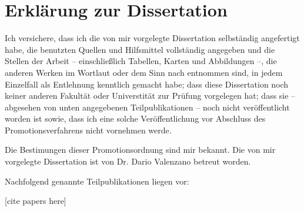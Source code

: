 
\cleardoublepage
\setsinglecolumn
\chapter*{\centering \LARGE Erkl\"arung zur Dissertation}
\pagestyle{empty}
Ich versichere, dass ich die von mir vorgelegte Dissertation selbst\"andig angefertigt habe, die benutzten Quellen und Hilfsmittel vollst\"andig angegeben und die Stellen der Arbeit -- einschlie{\ss}lich Tabellen, Karten und Abbildungen --, die anderen Werken im Wortlaut oder dem Sinn nach entnommen sind, in jedem Einzelfall als Entlehnung kenntlich gemacht habe; dass diese Dissertation noch keiner anderen Fakult\"at oder Universtit\"at zur Pr\"ufung vorgelegen hat; dass sie -- abgesehen von unten angegebenen Teilpublikationen -- noch nicht ver\"offentlicht worden ist sowie, dass ich eine solche Ver\"offentlichung vor Abschluss des Promotionsverfahrens nicht vornehmen werde.

\noindent Die Bestimungen dieser Promotionsordnung sind mir bekannt. Die von mir vorgelegte Dissertation ist von Dr. Dario Valenzano betreut worden.

\noindent Nachfolgend genannte Teilpublikationen liegen vor:

[cite papers here]

\declare{6em}
